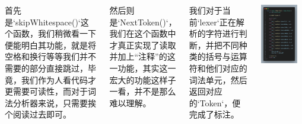 \documentclass{beamer}
\begin{document}
    \begin{frame}
        \begin{columns}
    		
            首先是`skipWhitespace()`这个函数，我们稍微看一下便能明白其功能，就是将空格和换行等等我们并不需要的部分直接跳过，毕竟，我们作为人看代码才更需要可读性，而对于词法分析器来说，只需要挨个阅读过去即可。

            然后则是`NextToken()`，我们在这个函数中才真正实现了读取并加上“注释”的这一功能，其实这一宏大的功能这样子一看，并不是那么难以理解。
            
            我们对于当前`lexer`正在解析的字符进行判断，并把不同种类的括号与运算符和他们对应的词法单元，然后返回对应的`Token`，便完成了标注。
    		
    		\centering
    		\includegraphics[width=0.85\textwidth]{pics/nextToken}
		\end{columns}
    \end{frame}
\end{document}
